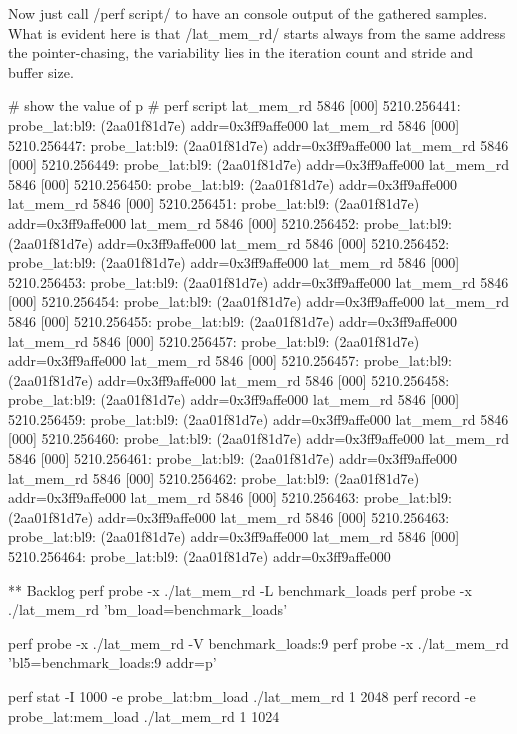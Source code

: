 Now just call /perf script/ to have an console output of the gathered
samples. What is evident here is that /lat_mem_rd/ starts always from
the same address the pointer-chasing, the variability lies in the
iteration count and stride and buffer size.


\starttyping[oddmaring=-1.5cm, evenmargin=-1.5cm]
# show the value of p
# perf script
      lat_mem_rd  5846 [000]  5210.256441: probe_lat:bl9: (2aa01f81d7e) addr=0x3ff9affe000
      lat_mem_rd  5846 [000]  5210.256447: probe_lat:bl9: (2aa01f81d7e) addr=0x3ff9affe000
      lat_mem_rd  5846 [000]  5210.256449: probe_lat:bl9: (2aa01f81d7e) addr=0x3ff9affe000
      lat_mem_rd  5846 [000]  5210.256450: probe_lat:bl9: (2aa01f81d7e) addr=0x3ff9affe000
      lat_mem_rd  5846 [000]  5210.256451: probe_lat:bl9: (2aa01f81d7e) addr=0x3ff9affe000
      lat_mem_rd  5846 [000]  5210.256452: probe_lat:bl9: (2aa01f81d7e) addr=0x3ff9affe000
      lat_mem_rd  5846 [000]  5210.256452: probe_lat:bl9: (2aa01f81d7e) addr=0x3ff9affe000
      lat_mem_rd  5846 [000]  5210.256453: probe_lat:bl9: (2aa01f81d7e) addr=0x3ff9affe000
      lat_mem_rd  5846 [000]  5210.256454: probe_lat:bl9: (2aa01f81d7e) addr=0x3ff9affe000
      lat_mem_rd  5846 [000]  5210.256455: probe_lat:bl9: (2aa01f81d7e) addr=0x3ff9affe000
      lat_mem_rd  5846 [000]  5210.256457: probe_lat:bl9: (2aa01f81d7e) addr=0x3ff9affe000
      lat_mem_rd  5846 [000]  5210.256457: probe_lat:bl9: (2aa01f81d7e) addr=0x3ff9affe000
      lat_mem_rd  5846 [000]  5210.256458: probe_lat:bl9: (2aa01f81d7e) addr=0x3ff9affe000
      lat_mem_rd  5846 [000]  5210.256459: probe_lat:bl9: (2aa01f81d7e) addr=0x3ff9affe000
      lat_mem_rd  5846 [000]  5210.256460: probe_lat:bl9: (2aa01f81d7e) addr=0x3ff9affe000
      lat_mem_rd  5846 [000]  5210.256461: probe_lat:bl9: (2aa01f81d7e) addr=0x3ff9affe000
      lat_mem_rd  5846 [000]  5210.256462: probe_lat:bl9: (2aa01f81d7e) addr=0x3ff9affe000
      lat_mem_rd  5846 [000]  5210.256463: probe_lat:bl9: (2aa01f81d7e) addr=0x3ff9affe000
      lat_mem_rd  5846 [000]  5210.256463: probe_lat:bl9: (2aa01f81d7e) addr=0x3ff9affe000
      lat_mem_rd  5846 [000]  5210.256464: probe_lat:bl9: (2aa01f81d7e) addr=0x3ff9affe000
\stoptyping


** Backlog
\starttyping
 perf probe -x ./lat_mem_rd -L benchmark_loads
 perf probe -x ./lat_mem_rd 'bm_load=benchmark_loads'

 perf probe -x ./lat_mem_rd -V benchmark_loads:9
 perf probe -x ./lat_mem_rd  'bl5=benchmark_loads:9 addr=p'

 perf stat -I 1000 -e probe_lat:bm_load ./lat_mem_rd 1 2048
 perf record -e probe_lat:mem_load ./lat_mem_rd 1 1024

